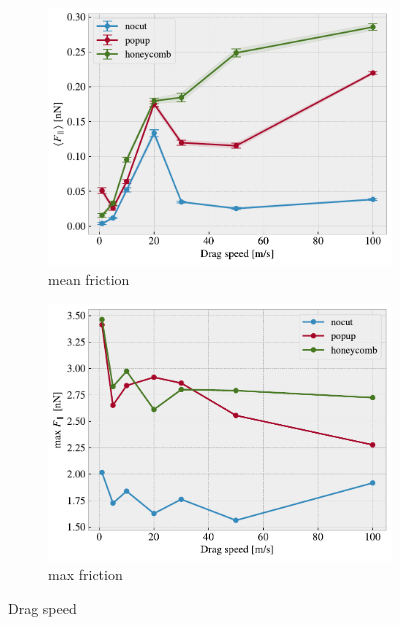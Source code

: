 \begin{figure}[H]
  \centering
  \begin{subfigure}[b]{0.49\textwidth}
      \centering
      \includegraphics[width=\textwidth]{figures/baseline/variables_vel_mean_K30.pdf}
      \caption{mean friction}
      \label{fig:var_vel_mean}
  \end{subfigure}
  \hfill
  \begin{subfigure}[b]{0.49\textwidth}
      \centering
      \includegraphics[width=\textwidth]{figures/baseline/variables_vel_max_K30.pdf}
      \caption{max friction}
      \label{fig:var_vel_max}
  \end{subfigure}
  \hfill
     \caption{Drag speed}
     \label{fig:var_vel}
\end{figure}


